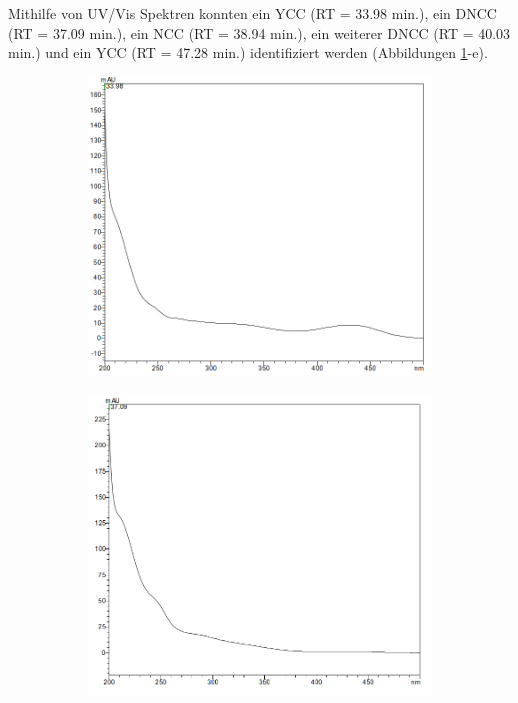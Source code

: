 \pagebreak
Mithilfe von UV/Vis Spektren konnten ein YCC (RT = 33.98 min.), ein DNCC (RT = 37.09 min.), ein NCC (RT = 38.94 min.), ein weiterer DNCC (RT = 40.03 min.) und ein YCC (RT = 47.28 min.) identifiziert werden (Abbildungen \ref{fig:YCC3398}-e). 

\begin{figure}[!htbp]
  \begin{subfigure}[b]{0.5\textwidth}
    \includegraphics[width=\textwidth]{figures/Kapitel6/Reaktion3h/YCC3398.png}
    \caption{}
    \label{fig:YCC3398}
  \end{subfigure}
  \hfill
  \begin{subfigure}[b]{0.5\textwidth}
    \includegraphics[width=\textwidth]{figures/Kapitel6/Reaktion3h/DNCC3709.png}
    \caption{}
    \label{fig:DNCC3709}
  \end{subfigure}
  

\end{figure}
